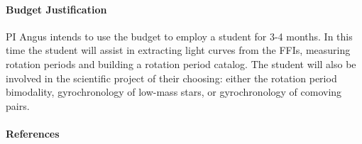 \documentclass[letterpaper,12pt,preprint]{hack_aastex}
\begin{document}
\paragraph{Budget Justification}
PI Angus intends to use the budget to employ a student for 3-4 months.
In this time the student will assist in extracting light curves from the FFIs,
measuring rotation periods and building a rotation period catalog.
The student will also be involved in the scientific project of their choosing:
either the rotation period bimodality, gyrochronology of low-mass stars, or
gyrochronology of comoving pairs.

\paragraph{References}

{\footnotesize

}
\end{document}
